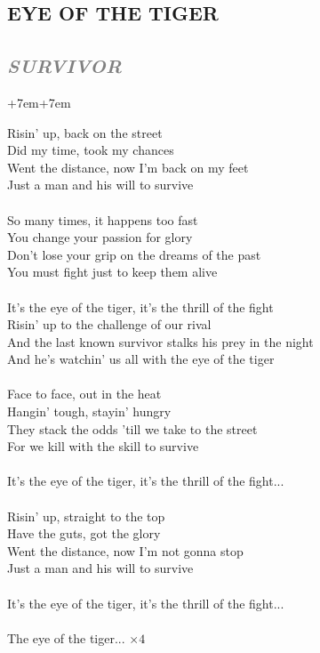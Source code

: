 \documentclass[100pt,a4paper]{report}
\newenvironment{song1}[3]
	{
			\begin{spacing}{0.6}
				\section*{\LARGE\centering \MakeUppercase{\textbf{{#1}}}}
				\subsection*{\Large\centering \textit{\textcolor{gray}{\MakeUppercase{{#2}}}}}
			\end{spacing}
			\vspace{0.8cm}
			\begin{adjustwidth}{+7em}{+7em}
			\Large
			
	}
	{
		\end{adjustwidth}
		\newpage
    }
\begin{document}
\begin{song1}{Eye of the tiger}{Survivor}
\noindent
Risin' up, back on the street\\
Did my time, took my chances\\
Went the distance, now I'm back on my feet\\
Just a man and his will to survive\\
\\
So many times, it happens too fast\\
You change your passion for glory\\
Don't lose your grip on the dreams of the past\\
You must fight just to keep them alive\\
\\
It's the eye of the tiger, it's the thrill of the fight\\
Risin' up to the challenge of our rival\\
And the last known survivor stalks his prey in the night\\
And he's watchin' us all with the eye of the tiger\\
\\
Face to face, out in the heat\\
Hangin' tough, stayin' hungry\\
They stack the odds 'till we take to the street\\
For we kill with the skill to survive\\
\\
It's the eye of the tiger, it's the thrill of the fight...\\
\\
Risin' up, straight to the top\\
Have the guts, got the glory\\
Went the distance, now I'm not gonna stop\\
Just a man and his will to survive\\
\\
It's the eye of the tiger, it's the thrill of the fight...\\
\\
The eye of the tiger... $\times 4$
\end{song1}
\end{document}
